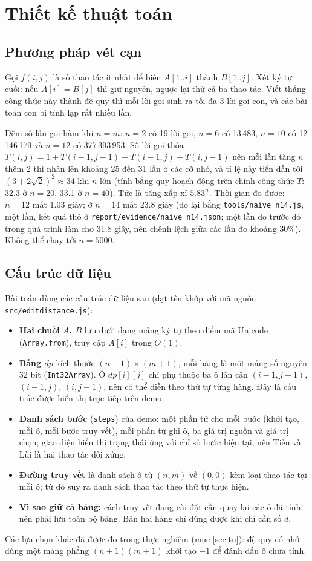 \documentclass[12pt,a4paper]{article}
\newcommand{\code}[1]{\texttt{#1}}
\begin{document}
\section{Thiết kế thuật toán}
\subsection{Phương pháp vét cạn}
Gọi $f(i,j)$ là số thao tác ít nhất để biến $A[1..i]$ thành $B[1..j]$. Xét ký tự cuối: nếu $A[i]=B[j]$ thì giữ nguyên, ngược lại thử cả ba thao tác. Viết thẳng công thức này thành đệ quy thì mỗi lời gọi sinh ra tối đa 3 lời gọi con, và các bài toán con bị tính lặp rất nhiều lần.

Đếm số lần gọi hàm khi $n=m$: $n=2$ có 19 lời gọi, $n=6$ có 13\,483, $n=10$ có 12\,146\,179 và $n=12$ có 377\,393\,953. Số lời gọi thỏa $T(i,j)=1+T(i-1,j-1)+T(i-1,j)+T(i,j-1)$ nên mỗi lần tăng $n$ thêm 2 thì nhân lên khoảng 25 đến 31 lần ở các cỡ nhỏ, và tỉ lệ này tiến dần tới $(3+2\sqrt2)^2\approx 34$ khi $n$ lớn (tính bằng quy hoạch động trên chính công thức $T$: 32.3 ở $n=20$, 33.1 ở $n=40$). Tức là tăng xấp xỉ $5.83^n$. Thời gian đo được: $n=12$ mất 1.03 giây; ở $n=14$ mất 23.8 giây (đo lại bằng \code{tools/naive\_n14.js}, một lần, kết quả thô ở \code{report/evidence/naive\_n14.json}; một lần đo trước đó trong quá trình làm cho 31.8 giây, nên chênh lệch giữa các lần đo khoảng 30\%). Không thể chạy tới $n=5000$.

\subsection{Cấu trúc dữ liệu}
Bài toán dùng các cấu trúc dữ liệu sau (đặt tên khớp với mã nguồn \code{src/editdistance.js}):
\begin{itemize}[nosep]
  \item \textbf{Hai chuỗi $A$, $B$} lưu dưới dạng mảng ký tự theo điểm mã Unicode (\code{Array.from}), truy cập $A[i]$ trong $O(1)$.
  \item \textbf{Bảng $dp$} kích thước $(n+1)\times(m+1)$, mỗi hàng là một mảng số nguyên 32 bit (\code{Int32Array}). Ô $dp[i][j]$ chỉ phụ thuộc ba ô lân cận $(i-1,j-1)$, $(i-1,j)$, $(i,j-1)$, nên có thể điền theo thứ tự từng hàng. Đây là cấu trúc được hiển thị trực tiếp trên demo.
  \item \textbf{Danh sách bước} (\code{steps}) của demo: một phần tử cho mỗi bước (khởi tạo, mỗi ô, mỗi bước truy vết), mỗi phần tử ghi ô, ba giá trị nguồn và giá trị chọn; giao diện hiển thị trạng thái ứng với chỉ số bước hiện tại, nên Tiến và Lùi là hai thao tác đối xứng.
  \item \textbf{Đường truy vết} là danh sách ô từ $(n,m)$ về $(0,0)$ kèm loại thao tác tại mỗi ô; từ đó suy ra danh sách thao tác theo thứ tự thực hiện.
  \item \textbf{Vì sao giữ cả bảng:} cách truy vết đang cài đặt cần quay lại các ô đã tính nên phải lưu toàn bộ bảng. Bản hai hàng chỉ dùng được khi chỉ cần số $d$.
\end{itemize}
Các lựa chọn khác đã được đo trong thực nghiệm (mục \ref{sec:tn}): đệ quy có nhớ dùng một mảng phẳng $(n+1)(m+1)$ khởi tạo $-1$ để đánh dấu ô chưa tính.
\end{document}

